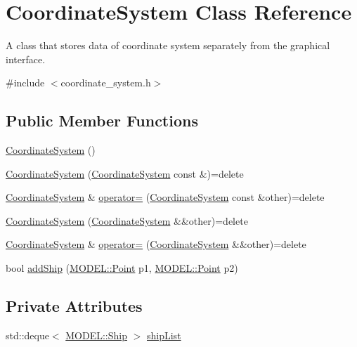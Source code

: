 \hypertarget{classMODEL_1_1CoordinateSystem}{}\section{Coordinate\+System Class Reference}
\label{classMODEL_1_1CoordinateSystem}


A class that stores data of coordinate system separately from the graphical interface.  




{\ttfamily \#include $<$coordinate\+\_\+system.\+h$>$}

\subsection*{Public Member Functions}
\begin{DoxyCompactItemize}
\item 
\hyperlink{classMODEL_1_1CoordinateSystem_a0f510c32a263eee79e23b75f085a7310}{Coordinate\+System} ()
\item 
\hyperlink{classMODEL_1_1CoordinateSystem_ad26ab1d9575143de58d6b3cff4db5512}{Coordinate\+System} (\hyperlink{classMODEL_1_1CoordinateSystem}{Coordinate\+System} const \&)=delete
\item 
\hyperlink{classMODEL_1_1CoordinateSystem}{Coordinate\+System} \& \hyperlink{classMODEL_1_1CoordinateSystem_a376f10ca28f88f8c64fe6e97cae72ba5}{operator=} (\hyperlink{classMODEL_1_1CoordinateSystem}{Coordinate\+System} const \&other)=delete
\item 
\hyperlink{classMODEL_1_1CoordinateSystem_ae2ac12d2a7cced154ff6e386093c28e5}{Coordinate\+System} (\hyperlink{classMODEL_1_1CoordinateSystem}{Coordinate\+System} \&\&other)=delete
\item 
\hyperlink{classMODEL_1_1CoordinateSystem}{Coordinate\+System} \& \hyperlink{classMODEL_1_1CoordinateSystem_ae7f1054276ec7cb6e3312046a03234d8}{operator=} (\hyperlink{classMODEL_1_1CoordinateSystem}{Coordinate\+System} \&\&other)=delete
\item 
bool \hyperlink{classMODEL_1_1CoordinateSystem_a4d891d157f79f1769e8f0f77315bb722}{add\+Ship} (\hyperlink{classMODEL_1_1Point}{M\+O\+D\+E\+L\+::\+Point} p1, \hyperlink{classMODEL_1_1Point}{M\+O\+D\+E\+L\+::\+Point} p2)
\end{DoxyCompactItemize}
\subsection*{Private Attributes}
\begin{DoxyCompactItemize}
\item 
std\+::deque$<$ \hyperlink{classMODEL_1_1Ship}{M\+O\+D\+E\+L\+::\+Ship} $>$ \hyperlink{classMODEL_1_1CoordinateSystem_ac3f25e91761f938fa2bdae218c7762d3}{ship\+List}
\end{DoxyCompactItemize}
